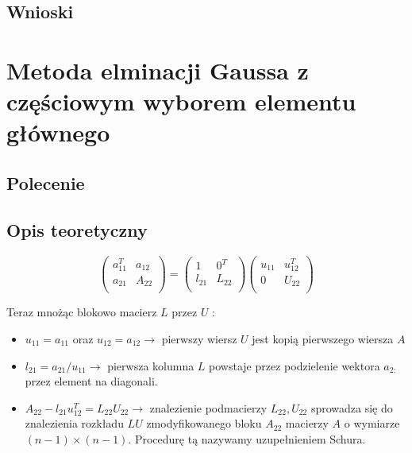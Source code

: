 \documentclass[a4paper, 11pt]{article}
\begin{document}
	
\subsection{Wnioski}
\indent 



\section{Metoda elminacji Gaussa z częściowym wyborem elementu głównego}

\subsection{Polecenie}


\subsection{Opis teoretyczny}



$$
\left( \begin{array}{ccc}
a_{11}^T & a_{12} \\
a_{21} & A_{22} \\
\end{array} \right)
=
\left( \begin{array}{ccc}
1 & 0^T \\
l_{21} & L_{22} \\
\end{array} \right)
\left( \begin{array}{ccc}
u_{11} & u_{12}^T \\
0 & U	_{22} \\
\end{array} \right)
$$

Teraz mnożąc blokowo macierz $L$ przez $U$ :
\begin{itemize}
\item $u_{11} = a_{11}$ oraz $u_{12} = a_{12} \to $ pierwszy wiersz $U$ jest kopią pierwszego wiersza $A$
\item $l_{21} = a_{21}/u_{11} \to$ pierwsza kolumna $L$ powstaje przez podzielenie wektora $a_{2:}$ przez element na diagonali.
\item $A_{22} - l_{21}u_{12}^T = L_{22}U_{22} \to$ znalezienie podmacierzy $L_{22} , U_{22}$ sprowadza się do znalezienia rozkładu $LU$ zmodyfikowanego bloku $A_{22}$ macierzy $A$ o wymiarze $(n-1)\times(n-1)$. Procedurę tą nazywamy uzupełnieniem Schura.
\end{itemize}
\end{document}
